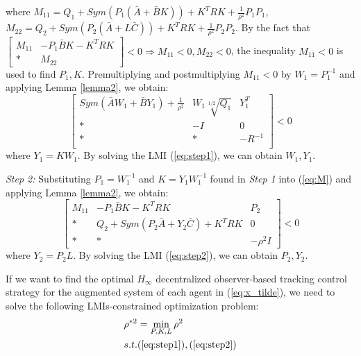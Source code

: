 \documentclass{ieeeaccess}
\begin{document}
where $M_{11}=Q_1+Sym(P_1(\bar{A}+\bar{B}K)) + K^TRK + \frac{1}{\rho^2}P_1P_1$, $M_{22}=Q_2+Sym(P_2(\bar{A}+L\bar{C})) + K^TRK + \frac{1}{\rho^2}P_2P_2$. By the fact that $\begin{bmatrix}
    M_{11} & -P_1\bar{B}K - K^TRK \\ * & M_{22}
\end{bmatrix} < 0 \Rightarrow M_{11}<0, M_{22}<0$, the inequality $M_{11}<0$ is used to find $P_1,K$. Premultiplying and
postmultiplying $M_{11}<0$ by $W_1=P_1^{-1}$ and applying Lemma \ref{lemma2}, we obtain:
\begin{equation} \label{eq:step1}
    \begin{bmatrix}
        Sym(\bar{A}W_1+\bar{B}Y_1) + \frac{1}{\rho^2} & W_1\sqrt[1/2]{Q_1} & Y_1^T \\
        * & -I & 0\\
        * & * & -R^{-1}\\
    \end{bmatrix} < 0
\end{equation}
where $Y_1=KW_1$. By solving the LMI (\ref{eq:step1}), we can obtain $W_1,Y_1$.

\textit{Step 2:} Substituting $P_1=W_1^{-1}$ and $K=Y_1W_1^{-1}$ found in \textit{Step 1} into (\ref{eq:M}) and applying Lemma \ref{lemma2}, we obtain:
\begin{equation} \label{eq:step2}
    \begin{bmatrix}
        M_{11} & -P_1\bar{B}K - K^TRK & P_2 \\
        * & Q_2+Sym(P_2\bar{A}+Y_2\bar{C}) + K^TRK & 0 \\
        * & * & -\rho^2I
    \end{bmatrix} < 0
\end{equation}
where $Y_2=P_2L$. By solving the LMI (\ref{eq:step2}), we can obtain $P_2,Y_2$.


If we want to find the optimal $H_\infty$ decentralized observer-based tracking control strategy for the augmented system of each agent in (\ref{eq:x_tilde}), we need to solve the following LMIs-constrained optimization problem:
\begin{equation} \label{LMI constraint}
    \begin{split}
        & \rho^{*2}=\mathop{\min}_{P,K,L} \rho^2 \\
        & s.t. (\refeq{eq:step1}),(\refeq{eq:step2}) 
    \end{split}
\end{equation}
\end{document}

